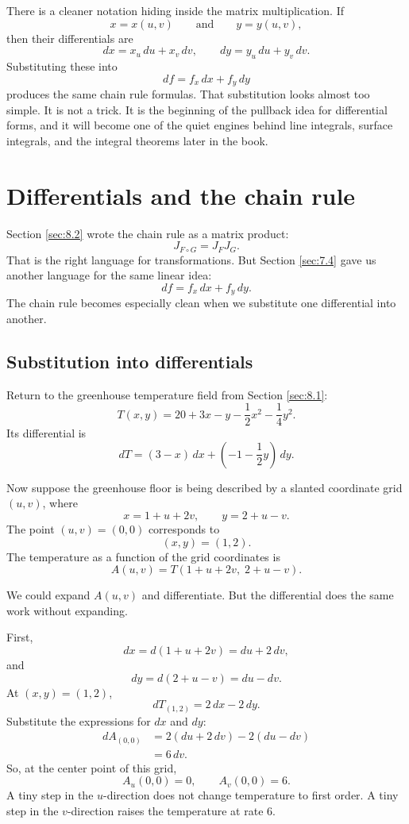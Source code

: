 There is a cleaner notation hiding inside the matrix multiplication.  If
\[
    x=x(u,v)
    \qquad\text{and}\qquad
    y=y(u,v),
\]
then their differentials are
\[
    dx=x_u\,du+x_v\,dv,
    \qquad
    dy=y_u\,du+y_v\,dv.
\]
Substituting these into
\[
    df=f_x\,dx+f_y\,dy
\]
produces the same chain rule formulas.  That substitution looks almost too simple.
It is not a trick.  It is the beginning of the pullback idea for differential forms, and it
will become one of the quiet engines behind line integrals, surface integrals, and the
integral theorems later in the book.

\section{Differentials and the chain rule}
\label{sec:8.3}

Section \ref{sec:8.2} wrote the chain rule as a matrix product:
\[
    J_{F\circ G}=J_FJ_G.
\]
That is the right language for transformations.  But Section \ref{sec:7.4} gave us
another language for the same linear idea:
\[
    df=f_x\,dx+f_y\,dy.
\]
The chain rule becomes especially clean when we substitute one differential into another.

\subsection{Substitution into differentials}

Return to the greenhouse temperature field from Section \ref{sec:8.1}:
\[
    T(x,y)=20+3x-y-\frac12x^2-\frac14y^2.
\]
Its differential is
\[
    dT=(3-x)\,dx+\left(-1-\frac12y\right)\,dy.
\]

Now suppose the greenhouse floor is being described by a slanted coordinate grid
\((u,v)\), where
\[
    x=1+u+2v,
    \qquad
    y=2+u-v.
\]
The point \((u,v)=(0,0)\) corresponds to
\[
    (x,y)=(1,2).
\]
The temperature as a function of the grid coordinates is
\[
    A(u,v)=T(1+u+2v,\;2+u-v).
\]

We could expand \(A(u,v)\) and differentiate.  But the differential does the same work
without expanding.

First,
\[
    dx=d(1+u+2v)=du+2\,dv,
\]
and
\[
    dy=d(2+u-v)=du-dv.
\]
At \((x,y)=(1,2)\),
\[
    dT_{(1,2)}
    =
    2\,dx-2\,dy.
\]
Substitute the expressions for \(dx\) and \(dy\):
\[
\begin{aligned}
    dA_{(0,0)}
    &=
    2(du+2\,dv)-2(du-dv)\\
    &=
    6\,dv.
\end{aligned}
\]
So, at the center point of this grid,
\[
    A_u(0,0)=0,
    \qquad
    A_v(0,0)=6.
\]
A tiny step in the \(u\)-direction does not change temperature to first order.  A tiny
step in the \(v\)-direction raises the temperature at rate \(6\).

